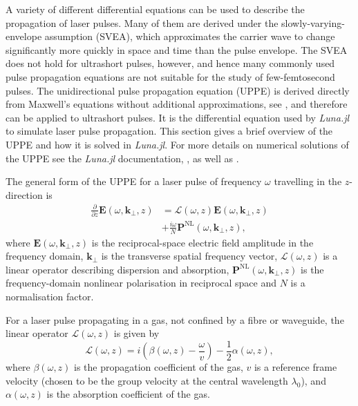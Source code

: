 \documentclass[a4paper]{jpconf}
\begin{document}
A variety of different differential equations  can be used to describe the propagation of laser pulses. Many of them are derived under the slowly-varying- envelope assumption (SVEA), which approximates the carrier wave to change significantly more quickly in space and time than the pulse envelope. The SVEA does not hold for ultrashort pulses, however, and hence many commonly used pulse propagation equations are not suitable for the study of few-femtosecond pulses. The unidirectional pulse propagation equation (UPPE) is derived directly from Maxwell's equations without additional approximations, see \cite{kolesik2004}, and therefore can be applied to ultrashort pulses. It is the differential equation used by \textit{Luna.jl} to simulate laser pulse propagation. This section gives a brief overview of the UPPE and how it is solved in \textit{Luna.jl}. For more details on numerical solutions of the UPPE see the \textit{Luna.jl} documentation, \cite{brahms2023}, as well as \cite{tani2014}. \par 
The general form of the UPPE for a laser pulse of frequency $\omega$ travelling in the $z$-direction is
\begin{align}\label{eq:UPPE}
\nonumber \frac{\partial}{\partial z} \mathbf{E}(\omega, \mathbf{k}_\perp, z)&= \mathcal{L}(\omega, z)\mathbf{E}(\omega, \mathbf{k}_\perp, z) \\ &+ \frac{i \omega}{N} \mathbf{P}^\text{NL}(\omega, \mathbf{k}_\perp, z),
\end{align}
where $\mathbf{E}(\omega, \mathbf{k}_\perp, z)$ is the reciprocal-space electric field amplitude in the frequency domain, $\mathbf{k}_\perp$ is the transverse spatial frequency vector,  $\mathcal{L}(\omega, z)$ is a linear operator describing dispersion and absorption, $\mathbf{P}^\text{NL}(\omega, \mathbf{k}_\perp, z)$ is the frequency-domain nonlinear polarisation in reciprocal space and $N$ is a normalisation factor. \par 
For a laser pulse propagating in a gas, not confined by a fibre or waveguide, the linear operator $\mathcal{L}(\omega, z)$ is given by 
\begin{equation}\label{eq:Lj}
\mathcal{L}(\omega, z) = i \left( \beta(\omega, z) - \frac{\omega}{v} \right) - \frac{1}{2} \alpha (\omega,z),
\end{equation}
where $\beta(\omega,z)$ is the propagation coefficient of the gas, $v$ is a reference frame velocity (chosen to be the group velocity at the central wavelength $\lambda_0$), and $\alpha(\omega,z)$ is the absorption coefficient of the gas. \par 
\end{document}
